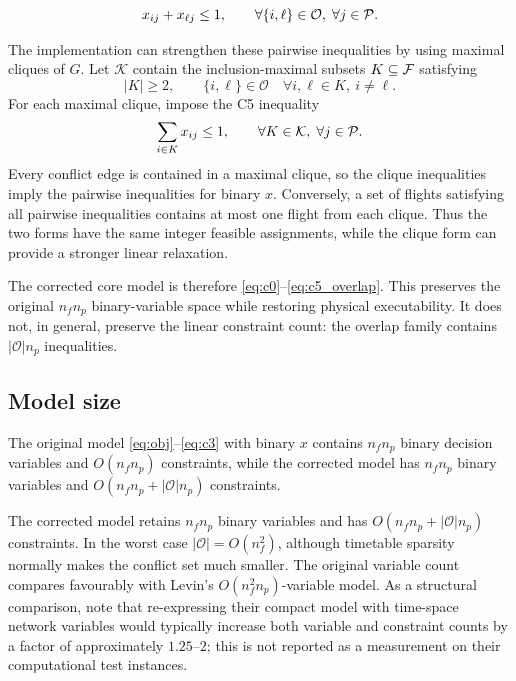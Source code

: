 \begin{equation}\label{eq:c4_overlap}
  x_{ij} + x_{\ell j} \le 1,
  \qquad \forall \{i,\ell\}\in\mathcal{O},\; \forall j\in\mathcal{P}.
\end{equation}

The implementation can strengthen these pairwise inequalities by using maximal
cliques of $G$. Let $\mathcal{K}$ contain the inclusion-maximal subsets
$K\subseteq\mathcal{F}$ satisfying
\begin{equation}
  |K|\geq2,\qquad
  \{i,\ell\}\in\mathcal{O}\quad\forall i,\ell\in K,\ i\neq\ell.
\end{equation}
For each maximal clique, impose the C5 inequality
\begin{equation}\label{eq:c5_overlap}
  \sum_{i\in K} x_{ij} \le 1,
  \qquad \forall K\in\mathcal{K},\; \forall j\in\mathcal{P}.
\end{equation}
Every conflict edge is contained in a maximal clique, so the clique inequalities
imply the pairwise inequalities for binary $x$. Conversely, a set of flights
satisfying all pairwise inequalities contains at most one flight from each
clique. Thus the two forms have the same integer feasible assignments, while
the clique form can provide a stronger linear relaxation.

The corrected core model is therefore
\eqref{eq:c0}--\eqref{eq:c5_overlap}.
This preserves the original $n_fn_p$ binary-variable space while restoring
physical executability. It does not, in general, preserve the linear
constraint count: the overlap family contains $|\mathcal{O}|n_p$ inequalities.

\subsection{Model size}

\begin{proposition}
  The original model \eqref{eq:obj}--\eqref{eq:c3} with binary $x$ contains $n_f n_p$ binary
  decision variables and $O(n_fn_p)$ constraints, while the corrected model has $n_fn_p$ binary variables and $O(n_fn_p+|\mathcal{O}|n_p)$ constraints.
\end{proposition}

The corrected model retains $n_fn_p$ binary variables and has
$O(n_fn_p+|\mathcal{O}|n_p)$ constraints. In the worst case
$|\mathcal{O}|=O(n_f^2)$, although timetable sparsity normally makes the
conflict set much smaller. The original variable count compares favourably
with Levin's $O(n_f^2n_p)$-variable model. As a structural comparison,
\citet{khaled2018compact} note that re-expressing their compact model with
time-space network variables would typically increase both variable and
constraint counts by a factor of approximately $1.25$--$2$; this is not
reported as a measurement on their computational test instances.

